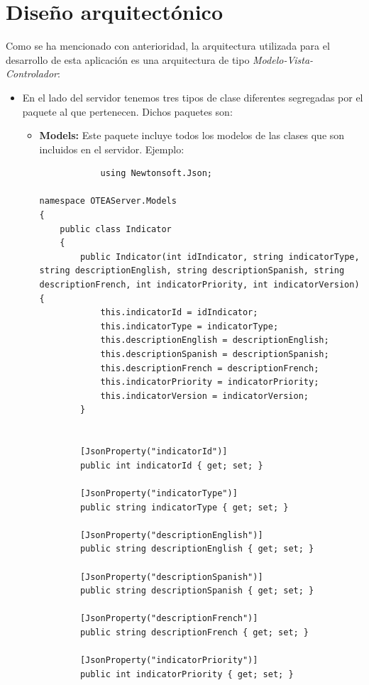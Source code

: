 \begin{itemize}
\end{itemize}
\section{Diseño arquitectónico}
Como se ha mencionado con anterioridad, la arquitectura utilizada para el desarrollo de esta aplicación es una arquitectura de tipo \textit{Modelo-Vista-Controlador}:
\begin{itemize}
    \item En el lado del servidor tenemos tres tipos de clase diferentes segregadas por el paquete al que pertenecen. Dichos paquetes son:
    \begin{itemize}
        \item \textbf{Models: }Este paquete incluye todos los modelos de las clases que son incluidos en el servidor. Ejemplo: \begin{lstlisting}
            using Newtonsoft.Json;

namespace OTEAServer.Models
{
    public class Indicator
    {
        public Indicator(int idIndicator, string indicatorType, string descriptionEnglish, string descriptionSpanish, string descriptionFrench, int indicatorPriority, int indicatorVersion) {
            this.indicatorId = idIndicator;
            this.indicatorType = indicatorType;
            this.descriptionEnglish = descriptionEnglish;
            this.descriptionSpanish = descriptionSpanish;
            this.descriptionFrench = descriptionFrench;
            this.indicatorPriority = indicatorPriority;
            this.indicatorVersion = indicatorVersion;
        }


        [JsonProperty("indicatorId")]
        public int indicatorId { get; set; }

        [JsonProperty("indicatorType")]
        public string indicatorType { get; set; }

        [JsonProperty("descriptionEnglish")]
        public string descriptionEnglish { get; set; }
        
        [JsonProperty("descriptionSpanish")]
        public string descriptionSpanish { get; set; }
        
        [JsonProperty("descriptionFrench")]
        public string descriptionFrench { get; set; }

        [JsonProperty("indicatorPriority")]
        public int indicatorPriority { get; set; }


\end{lstlisting}
\end{itemize}
\end{itemize}
